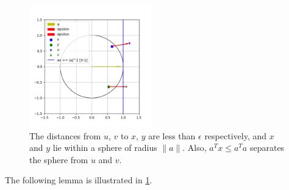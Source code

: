 \begin{figure}[ht]
	\centering
	\includegraphics[width=200px]{images/spokes.png}
	\caption[A depiction of the quantities within \cref{properties_of_a_circle}.]{ %
			The distances from $u$, $v$ to $x$, $y$ are less than $\epsilon$ respectively, and $x$ and $y$ lie within a sphere of radius $\|a\|$.
			Also, $a^Tx \le a^Ta$ separates the sphere from $u$ and $v$.
	}
	\label{first_lemma}
\end{figure}
The following lemma is illustrated in \cref{first_lemma}.
